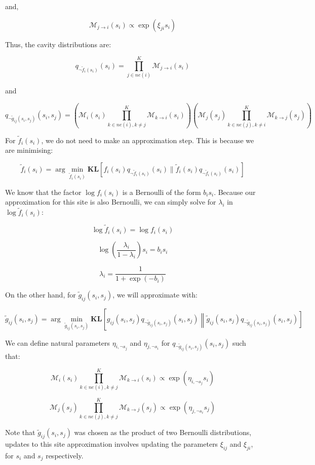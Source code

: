 \documentclass[12pt]{article}
\begin{document}
and,

\[\mathcal{M}_{j \rightarrow i}(s_i) \propto \exp\left(\xi_{ji} s_i\right)\]



Thus, the cavity distributions are:

\[q_{\neg \tilde{f}_i(s_i)}(s_i) =
\prod_{j\in ne(i)}^{K} \mathcal{M}_{j \rightarrow i}(s_i)
\]

and

\[q_{\neg \tilde{g}_{ij}(s_i, s_j)}(s_i, s_j) = \left( \mathcal{M}_{i}(s_i) \prod_{k\in ne(i), k\neq j}^{K} \mathcal{M}_{k \rightarrow i}(s_i)
\right)\left( \mathcal{M}_{j}(s_j) \prod_{k\in ne(j), k\neq i}^{K} \mathcal{M}_{k \rightarrow j}(s_j)
\right)
\]

For $\tilde{f}_{i}(s_{i})$, we do not need to make an approximation step.
This is because we are minimising:

\[\tilde{f}_{i}(s_{i}) = \arg \min_{\tilde{f}_{i}(s_{i})} \textbf{KL} \left[ f_{i}(s_{i}) q_{\neg \tilde{f}_i(s_i)}(s_i) \| \tilde{f}_{i}(s_{i}) q_{\neg \tilde{f}_i(s_i)}(s_i) \right]\]

We know that the factor $\log f_i(s_i)$ is a Bernoulli of the form $b_i s_i$. Because our approximation for this site is also Bernoulli, we can simply solve for $\lambda_i$ in $\log \tilde{f}_{i}(s_{i})$:

\[\log \tilde{f}_i(s_i) = \log f_{i}(s_{i})\]


\[\log \left(\frac{\lambda_i}{1-\lambda_i} \right)s_i = b_i s_i\]

\[\lambda_i = \frac{1}{1+\exp(-b_i)}\]

On the other hand, for $\tilde{g}_{ij}(s_i, s_j)$, we will approximate with:

\[\tilde{g}_{ij}(s_i, s_j) = \arg \min_{\tilde{g}_{ij}(s_i, s_j)} \textbf{KL} \left[ g_{ij}(s_i, s_j) q_{\neg \tilde{g}_{ij}(s_i, s_j)}(s_i, s_j) \left\| \tilde{g}_{ij}(s_i, s_j) q_{\neg \tilde{g}_{ij}(s_i, s_j)}(s_i, s_j) \right]\]

We can define natural parameters $\eta_{i, \neg s_j}$ and $\eta_{j, \neg s_i}$ for $q_{\neg \tilde{g}_{ij}(s_i, s_j)}(s_i, s_j)$ such that:

\[\mathcal{M}_{i}(s_i) \prod_{k\in ne(i), k\neq j}^{K} \mathcal{M}_{k \rightarrow i}(s_i) \propto \exp(\eta_{i, \neg s_j} s_i)\]

\[ \mathcal{M}_{j}(s_j) \prod_{k\in ne(j), k\neq j}^{K} \mathcal{M}_{k \rightarrow j}(s_j) \propto \exp(\eta_{j, \neg s_i} s_j)\]

Note that $\tilde{g}_{ij}(s_i, s_j)$ was chosen as the product of two Bernoulli distributions, updates to this site approximation involves updating the  parameters $\xi_{ij}$ and $\xi_{ji}$, for $s_i$ and $s_j$ respectively.
\end{document}
